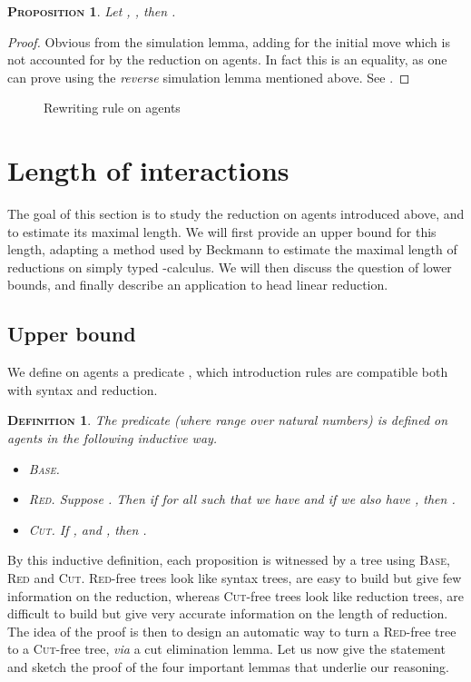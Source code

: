 \documentclass{article}
\newtheorem{definition}{\textsc{Definition}}
\newtheorem{proposition}{\textsc{Proposition}}
\begin{document}
\begin{proposition}
Let , , then .
\label{equiv}
\end{proposition}
\begin{proof}
Obvious from the simulation lemma, adding  for the initial move which is not accounted for by the reduction on agents. In fact this is an equality, as one can prove using the \emph{reverse} simulation
lemma mentioned above. See \cite{phd}.
\end{proof}

\begin{figure}

\caption{Rewriting rule on agents}
\label{rewrite}
\end{figure}

\section{Length of interactions}

The goal of this section is to study the reduction on agents introduced above, and to estimate its maximal length. We will first provide an upper bound for this length, adapting a 
method used by Beckmann \cite{beckmann2001exact} to estimate the maximal length of reductions on simply typed -calculus. We will then discuss the question of lower bounds, and finally
describe an application to head linear reduction.

\subsection{Upper bound}

We define on agents a predicate , which introduction rules are compatible both with syntax and reduction.

\begin{definition}
The predicate  (where  range over natural numbers) is defined on agents in the following inductive way.
\begin{itemize}
\item \textsc{Base.} 
\item \textsc{Red.} Suppose . Then if for all  such that  we have  and if
we also have , then .
\item \textsc{Cut.} If ,  and , then .
\end{itemize}
\end{definition}

By this inductive definition, each proposition  is witnessed by a tree using \textsc{Base}, \textsc{Red} and \textsc{Cut}. \textsc{Red}-free trees look like
syntax trees, are easy to build but give few information on the reduction, whereas \textsc{Cut}-free trees look like reduction trees, are difficult to build but give very accurate information
on the length of reduction. The idea of the proof is then to design an automatic way to turn a \textsc{Red}-free tree to a \textsc{Cut}-free tree, \emph{via} a cut elimination lemma.
Let us now give the statement and sketch the proof of the four important lemmas that underlie our reasoning.
\end{document}
